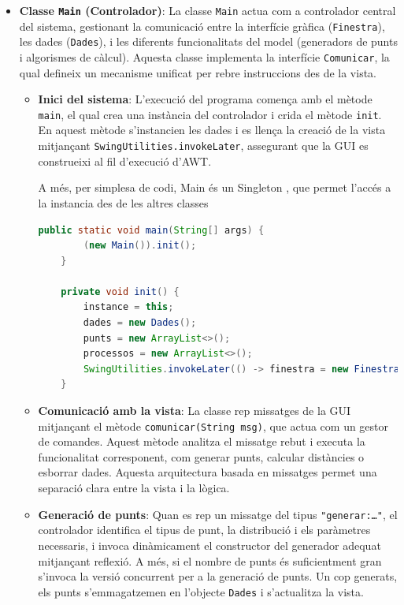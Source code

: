 \documentclass{ieeetj}
\begin{document}
\begin{itemize}
\item \textbf{Classe \texttt{Main} (Controlador)}: La classe \texttt{Main} actua com a controlador central del sistema, gestionant la comunicació entre la interfície gràfica (\texttt{Finestra}), les dades (\texttt{Dades}), i les diferents funcionalitats del model (generadors de punts i algorismes de càlcul). Aquesta classe implementa la interfície \texttt{Comunicar}, la qual defineix un mecanisme unificat per rebre instruccions des de la vista.

\begin{itemize}
    \item \textbf{Inici del sistema}: L'execució del programa comença amb el mètode \texttt{main}, el qual crea una instància del controlador i crida el mètode \texttt{init}. En aquest mètode s’instancien les dades i es llença la creació de la vista mitjançant \texttt{SwingUtilities.invokeLater}, assegurant que la GUI es construeixi al fil d'execució d'AWT.

    A més, per simplesa de codi, Main és un Singleton \cite{singleton}, que permet l'accés a la instancia des de les altres classes

    \begin{lstlisting}[language=java]
    public static void main(String[] args) {
        (new Main()).init();
    }

    private void init() {
        instance = this;
        dades = new Dades();
        punts = new ArrayList<>();
        processos = new ArrayList<>();
        SwingUtilities.invokeLater(() -> finestra = new Finestra());
    }
    \end{lstlisting}

    \item \textbf{Comunicació amb la vista}: La classe rep missatges de la GUI mitjançant el mètode \texttt{comunicar(String msg)}, que actua com un gestor de comandes. Aquest mètode analitza el missatge rebut i executa la funcionalitat corresponent, com generar punts, calcular distàncies o esborrar dades. Aquesta arquitectura basada en missatges permet una separació clara entre la vista i la lògica.

    \item \textbf{Generació de punts}: Quan es rep un missatge del tipus \texttt{"generar:\dots"}, el controlador identifica el tipus de punt, la distribució i els paràmetres necessaris, i invoca dinàmicament el constructor del generador adequat mitjançant reflexió. A més, si el nombre de punts és suficientment gran s'invoca la versió concurrent per a la generació de punts. Un cop generats, els punts s’emmagatzemen en l’objecte \texttt{Dades} i s’actualitza la vista.


\end{itemize}
\end{itemize}
\end{document}
